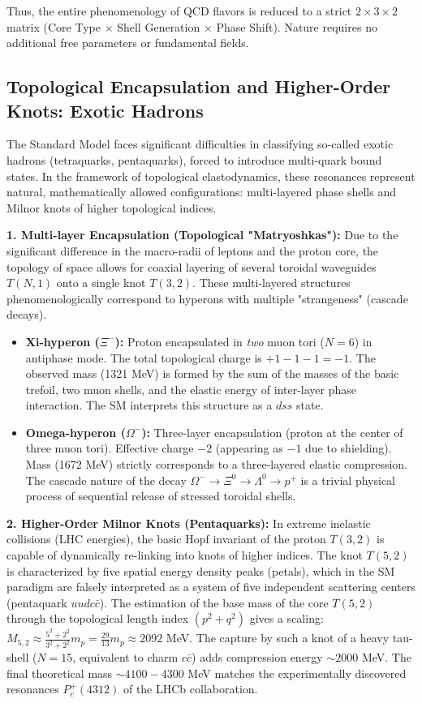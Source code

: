 \documentclass[11pt,a4paper]{article}
\begin{document}
	Thus, the entire phenomenology of QCD flavors is reduced to a strict $2 \times 3 \times 2$ matrix (Core Type $\times$ Shell Generation $\times$ Phase Shift). Nature requires no additional free parameters or fundamental fields.
	
\subsection{Topological Encapsulation and Higher-Order Knots: Exotic Hadrons}
	The Standard Model faces significant difficulties in classifying so-called exotic hadrons (tetraquarks, pentaquarks), forced to introduce multi-quark bound states. In the framework of topological elastodynamics, these resonances represent natural, mathematically allowed configurations: multi-layered phase shells and Milnor knots of higher topological indices.
	
	\textbf{1. Multi-layer Encapsulation (Topological "Matryoshkas"):}
	Due to the significant difference in the macro-radii of leptons and the proton core, the topology of space allows for coaxial layering of several toroidal waveguides $T(N,1)$ onto a single knot $T(3,2)$. These multi-layered structures phenomenologically correspond to hyperons with multiple "strangeness" (cascade decays).
	\begin{itemize}
		\item \textbf{Xi-hyperon ($\Xi^-$):} Proton encapsulated in \textit{two} muon tori ($N=6$) in antiphase mode. The total topological charge is $+1 - 1 - 1 = -1$. The observed mass (1321 MeV) is formed by the sum of the masses of the basic trefoil, two muon shells, and the elastic energy of inter-layer phase interaction. The SM interprets this structure as a $dss$ state.
		\item \textbf{Omega-hyperon ($\Omega^-$):} Three-layer encapsulation (proton at the center of three muon tori). Effective charge $-2$ (appearing as $-1$ due to shielding). Mass (1672 MeV) strictly corresponds to a three-layered elastic compression. The cascade nature of the decay $\Omega^- \to \Xi^0 \to \Lambda^0 \to p^+$ is a trivial physical process of sequential release of stressed toroidal shells.
	\end{itemize}
	
	\textbf{2. Higher-Order Milnor Knots (Pentaquarks):}
	In extreme inelastic collisions (LHC energies), the basic Hopf invariant of the proton $T(3,2)$ is capable of dynamically re-linking into knots of higher indices. The knot $T(5,2)$ is characterized by five spatial energy density peaks (petals), which in the SM paradigm are falsely interpreted as a system of five independent scattering centers (pentaquark $uudc\bar{c}$). 
	The estimation of the base mass of the core $T(5,2)$ through the topological length index $(p^2+q^2)$ gives a scaling: $M_{5,2} \approx \frac{5^2+2^2}{3^2+2^2} m_p = \frac{29}{13} m_p \approx 2092$ MeV. The capture by such a knot of a heavy tau-shell ($N=15$, equivalent to charm $c\bar{c}$) adds compression energy $\sim 2000$ MeV. The final theoretical mass $\sim 4100-4300$ MeV matches the experimentally discovered resonances $P_c^+(4312)$ of the LHCb collaboration.
	
\end{document}
